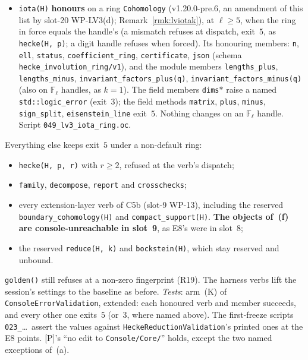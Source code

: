 \documentclass[11pt]{article}
\theoremstyle{remark}
\newcommand{\F}{\mathbb{F}}
\newcommand{\Fl}{\F_\ell}
\begin{document}
\begin{itemize}
  included (then it is $U_\ell$). Its honouring members:
  \begin{itemize}
  \item \texttt{.coefficient\_ring};
  \item \texttt{.A(q)}, the (c5) matrix on the cyclic summands;
  \item \texttt{.charpoly\_free}, the Record \texttt{\{precision, coeffs\}} of~(d), defined only at
    a certified level; otherwise it raises the named \texttt{std::logic\_error}, which is exit~$3$.
  \end{itemize}
  Every other member exits~$5$.
\item \texttt{iota(H)} \textbf{honours} on a ring \texttt{Cohomology} (v1.20.0-pre.6, an amendment of this list by slot-20 WP-LV3(d); Remark~\ref{rmk:lviotak}), at $\ell\ge5$, when the ring in force
  equals the handle's (a mismatch refuses at dispatch, exit~$5$, as \texttt{hecke(H, p)}; a digit handle refuses when forced). Its honouring members: \texttt{n}, \texttt{ell}, \texttt{status},
  \texttt{coefficient\_ring}, \texttt{certificate}, \texttt{json} (schema \texttt{hecke\_involution\_ring/v1}), and the module members \texttt{lengths\_plus}, \texttt{lengths\_minus},
  \texttt{invariant\_factors\_plus(q)}, \texttt{invariant\_factors\_minus(q)} (also on $\Fl$ handles, as $k=1$). The field members \texttt{dims}$\ast$ raise a named \texttt{std::logic\_error}
  (exit~$3$); the field methods \texttt{matrix}, \texttt{plus}, \texttt{minus}, \texttt{sign\_split}, \texttt{eisenstein\_line} exit~$5$. Nothing changes on an $\Fl$ handle. Script
  \texttt{049\_lv3\_iota\_ring.oc}.
\end{itemize}
Everything else keeps exit~$5$ under a non-default ring:
\begin{itemize}
\item \texttt{hecke(H, p, r)} with $r\ge2$, refused at the verb's dispatch;
\item \texttt{family}, \texttt{decompose}, \texttt{report} and \texttt{crosschecks};
\item every extension-layer verb of C5b (slot-9 WP-13), including the reserved
  \texttt{boundary\_cohomology(H)} and \texttt{compact\_support(H)}. \textbf{The objects of~(f) are
  console-unreachable in slot~9}, as E8's were in slot~8;
\item the reserved \texttt{reduce(H, k)} and \texttt{bockstein(H)}, which stay reserved and unbound.
\end{itemize}
\texttt{golden()} still refuses at a non-zero fingerprint (R19). The harness verbs lift the
session's settings to the baseline as before.
\emph{Tests}: arm~(K) of \texttt{ConsoleErrorValidation}, extended: each honoured verb and member
succeeds, and every other one exits~$5$ (or~$3$, where named above). The first-freeze scripts
\texttt{023\_}\ldots\ assert the values against \texttt{HeckeReductionValidation}'s printed ones
at the E8 points. [P]'s ``no edit to \texttt{Console/Core/}'' holds, except the two named
exceptions of~(a).
\end{document}
